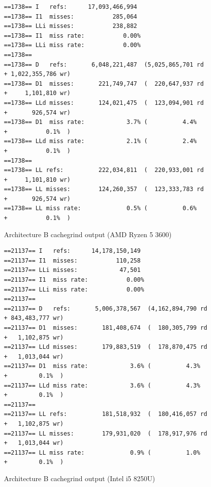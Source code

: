 \documentclass{article}
\begin{document}
\begin{figure}[!h]
\centering
\begin{BVerbatim}
==1738== I   refs:      17,093,466,994
==1738== I1  misses:           285,064
==1738== LLi misses:           238,882
==1738== I1  miss rate:           0.00%
==1738== LLi miss rate:           0.00%
==1738== 
==1738== D   refs:       6,048,221,487  (5,025,865,701 rd   + 1,022,355,786 wr)
==1738== D1  misses:       221,749,747  (  220,647,937 rd   +     1,101,810 wr)
==1738== LLd misses:       124,021,475  (  123,094,901 rd   +       926,574 wr)
==1738== D1  miss rate:            3.7% (          4.4%     +           0.1%  )
==1738== LLd miss rate:            2.1% (          2.4%     +           0.1%  )
==1738== 
==1738== LL refs:          222,034,811  (  220,933,001 rd   +     1,101,810 wr)
==1738== LL misses:        124,260,357  (  123,333,783 rd   +       926,574 wr)
==1738== LL miss rate:             0.5% (          0.6%     +           0.1%  )
\end{BVerbatim}
\caption{Architecture B cachegrind output (AMD Ryzen 5 3600)}
\label{arch_b_cachegrind_pc}
\end{figure}

\begin{figure}[!h]
\centering
\begin{BVerbatim}
==21137== I   refs:      14,178,150,149
==21137== I1  misses:           110,258
==21137== LLi misses:            47,501
==21137== I1  miss rate:           0.00%
==21137== LLi miss rate:           0.00%
==21137== 
==21137== D   refs:       5,006,378,567  (4,162,894,790 rd   + 843,483,777 wr)
==21137== D1  misses:       181,408,674  (  180,305,799 rd   +   1,102,875 wr)
==21137== LLd misses:       179,883,519  (  178,870,475 rd   +   1,013,044 wr)
==21137== D1  miss rate:            3.6% (          4.3%     +         0.1%  )
==21137== LLd miss rate:            3.6% (          4.3%     +         0.1%  )
==21137== 
==21137== LL refs:          181,518,932  (  180,416,057 rd   +   1,102,875 wr)
==21137== LL misses:        179,931,020  (  178,917,976 rd   +   1,013,044 wr)
==21137== LL miss rate:             0.9% (          1.0%     +         0.1%  )
\end{BVerbatim}
\caption{Architecture B cachegrind output (Intel i5 8250U)}
\label{arch_b_cachegrind_laptop}
\end{figure}
\end{document}
